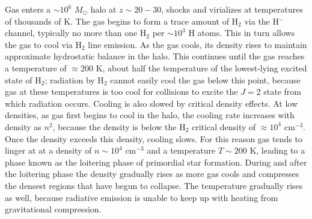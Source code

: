 Gas enters a $\sim 10^6$ $M_\odot$ halo at $z\sim 20-30$, shocks and virializes at temperatures of thousands of K. The gas begins to form a trace amount of H$_2$ via the H$^{-}$ channel, typically no more than one H$_2$ per $\sim 10^3$ H atoms. This in turn allows the gas to cool via H$_2$ line emission. As the gas cools, its density rises to maintain approximate hydrostatic balance in the halo. This continues until the gas reaches a temperature of $\approx 200$ K, about half the temperature of the lowest-lying excited state of H$_2$; radiation by H$_2$ cannot easily cool the gas below this point, because gas at these temperatures is too cool for collisions to excite the $J=2$ state from which radiation occurs. Cooling is also slowed by critical density effects. At low densities, as gas first begins to cool in the halo, the cooling rate increases with density as $n^2$, because the density is below the H$_2$ critical density of $\approx 10^4$ cm$^{-3}$. Once the density exceeds this density, cooling slows. For this reason gas tends to linger at at a density of $n\sim 10^4$ cm$^{-3}$ and a temperature $T\sim 200$ K, leading to a phase known as the loitering phase of primordial star formation. During and after the loitering phase the density gradually rises as more gas cools and compresses the densest regions that have begun to collapse. The temperature gradually rises as well, because radiative emission is unable to keep up with heating from gravitational compression.

